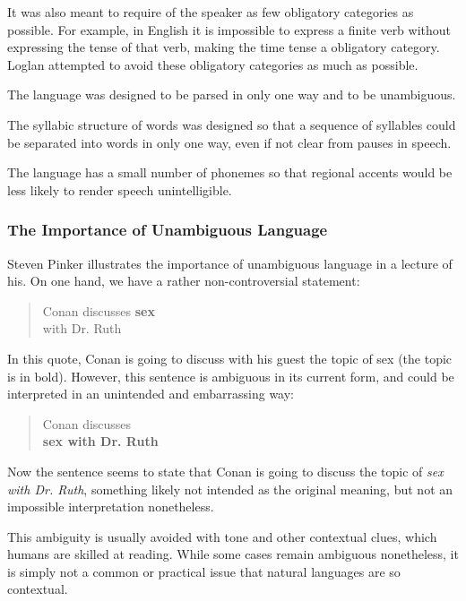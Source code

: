 \documentclass[12pt]{book}
\begin{document}
It was also meant to require of the speaker as few obligatory categories as possible. For example, in English it is impossible to express a finite verb without expressing the tense of that verb, making the time tense a obligatory category. Loglan attempted to avoid these obligatory categories as much as possible. 


The language was designed to be parsed in only one way and to be unambiguous. 

The syllabic structure of words was designed so that a sequence of syllables could be separated into words in only one way, even if not clear from pauses in speech. 

The language has a small number of phonemes so that regional accents would be less likely to render speech unintelligible. 


\subsubsection{The Importance of Unambiguous Language}


Steven Pinker illustrates the importance of unambiguous language in a lecture of his. On one hand, we have a rather non-controversial statement: 

\begin{quote}
Conan discusses \textbf{sex} \\
with Dr. Ruth
\end{quote}

In this quote, Conan is going to discuss with his guest the topic of sex (the topic is in bold). However, this sentence is ambiguous in its current form, and could be interpreted in an unintended and embarrassing way:
 
\begin{quote}
Conan discusses \\
\textbf{sex with Dr. Ruth}
\end{quote}

Now the sentence seems to state that Conan is going to discuss the topic of \emph{sex with Dr. Ruth}, something likely not intended as the original meaning, but not an impossible interpretation nonetheless. \cite[22:58]{PinkerWindow}

This ambiguity is usually avoided with tone and other contextual clues, which humans are skilled at reading. While some cases remain ambiguous nonetheless, it is simply not a common or practical issue that natural languages are so contextual. 
\end{document}
